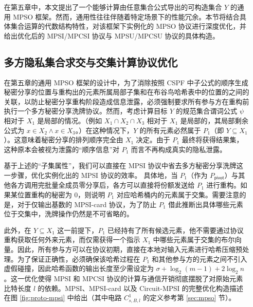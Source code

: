 在第五章中，本文提出了一个能够计算由任意集合公式导出的可构造集合 $Y$ 的通用 MPSO 框架。然而，通用性往往伴随着特定场景下的性能冗余。本节将结合具体集合运算的代数结构特性，对该框架下实例化的 MPSO 协议进行深度优化，并给出优化后的 MPSI/MPCSI 协议与 MPSU/MPCSU 协议的具体构造。

\subsection{多方隐私集合求交与交集计算协议优化}

在第五章的通用 MPSO 框架的设计中，为了消除按照 CSPF 中子公式的顺序生成秘密分享的位置与重构出的元素所属局部子集和在布谷鸟哈希表中的位置的之间的关联，以防止秘密分享重构阶段造成信息泄露，必须强制要求所有参与方在重构前执行一个多方秘密分享洗牌协议。然而，考虑计算目标 $Y$ 的规范集合谓词公式 $\psi$ 相对于 $X_1$ 是局部的情况。（例如 $X_1 \cap X_2 \cap X_3$ 相对于 $X_1$ 是局部的，其局部剩余公式为 $x \in X_2 \land x \in X_3$。）在这种情况下，$Y$ 的所有元素必然属于 $P_1$（即 $Y \subseteq X_1$）。这意味着秘密分享的排列顺序完全由 $X_1$ 决定。由于 $P_1$ 最终将获得结果集，这种原本会被视为泄露的“顺序信息”对 $P_1$ 而言不再构成真实的隐私泄露。

基于上述的“子集属性”，我们可以直接在 MPSI 协议中省去多方秘密分享洗牌这一步骤，优化实例化出的 MPSI 协议的效率。
具体地，当 $P_1$（作为 $P_{\mathsf{pivot}}$）与其他各方调用完批量全成员零分享后，各方可以直接将份额发送给 $P_1$ 进行重构。如果某位置重构的秘密为 0，则说明 $P_1$ 对应哈希桶内的元素属于交集。需要注意的是，对于仅输出基数的 MPSI-card 协议，为了防止 $P_1$ 借此推断出具体哪些元素位于交集中，洗牌操作仍然是不可省略的。

此外，在 $Y \subseteq X_1$ 这一前提下，$P_1$ 已经持有了所有候选元素，他不需要通过协议重构获取任何外来元素，而仅需获得一个指示 $X_1$ 中哪些元素属于交集的布尔向量。因此，所有参与方可以在协议初期，直接在本地对输入元素进行哈希压缩预处理。为了保证正确性，必须确保该哈希过程在 $P_1$ 和其他参与方的元素之间不引入虚假碰撞，因此哈希函数的输出长度至少需设定为 $\sigma + \log_2 (m-1) + 2 \log_2 n$。这一优化使得 MPSI 和 MPCSI 协议的计算与通信开销彻底摆脱了对原始元素比特长度 $l$ 的依赖。MPSI、MPSI-card 以及 Circuit-MPSI 的完整优化构造描述在图 \ref{fig:proto-mpsi} 中给出（其中电路 $C_{s,B,l}^1$ 的定义参考第 \ref{sec:mpso} 节）。

